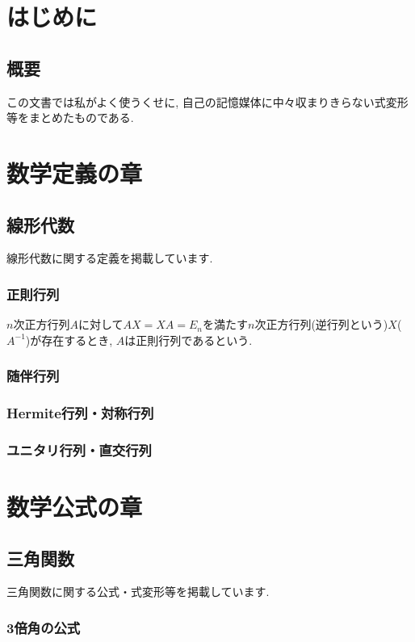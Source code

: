 \documentclass[]{jreport}
\begin{document}
\part{はじめに}
\chapter{概要}

この文書では私がよく使うくせに, 自己の記憶媒体に中々収まりきらない式変形等をまとめたものである.

\part{数学定義の章}
\chapter{線形代数}

線形代数に関する定義を掲載しています.

\section{正則行列}

$n$次正方行列$A$に対して$AX=XA=E_n$を満たす$n$次正方行列(逆行列という)$X$($A^{-1}$)が存在するとき, $A$は正則行列であるという.

\section{随伴行列}

\section{Hermite行列・対称行列}

\section{ユニタリ行列・直交行列}

\part{数学公式の章}
\chapter{三角関数}

三角関数に関する公式・式変形等を掲載しています.

\section{3倍角の公式}
\end{document}
